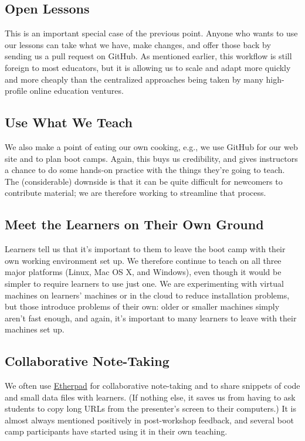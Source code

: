 \documentclass[10pt,a4paper,twocolumn]{article}
\begin{document}
\subsection*{Open Lessons}

This is an important special case of the previous point. Anyone who
wants to use our lessons can take what we have, make changes, and offer
those back by sending us a pull request on GitHub. As mentioned earlier,
this workflow is still foreign to most educators, but it is allowing us
to scale and adapt more quickly and more cheaply than the centralized
approaches being taken by many high-profile online education ventures.

\subsection*{Use What We Teach}

We also make a point of eating our own cooking, e.g., we use GitHub for
our web site and to plan boot camps. Again, this buys us credibility,
and gives instructors a chance to do some hands-on practice with the
things they're going to teach. The (considerable) downside is that it
can be quite difficult for newcomers to contribute material; we are
therefore working to streamline that process.

\subsection*{Meet the Learners on Their Own Ground}

Learners tell us that it's important to them to leave the boot camp with
their own working environment set up. We therefore continue to teach on
all three major platforms (Linux, Mac OS X, and Windows), even though it
would be simpler to require learners to use just one. We are
experimenting with virtual machines on learners' machines or in the
cloud to reduce installation problems, but those introduce problems of
their own: older or smaller machines simply aren't fast enough, and
again, it's important to many learners to leave with their machines set
up.

\subsection*{Collaborative Note-Taking}

We often use \href{http://etherpad.org}{Etherpad} for collaborative
note-taking and to share snippets of code and small data files with
learners. (If nothing else, it saves us from having to ask students to
copy long URLs from the presenter's screen to their computers.) It is
almost always mentioned positively in post-workshop feedback, and
several boot camp participants have started using it in their own
teaching.
\end{document}
